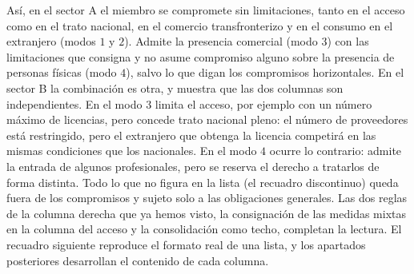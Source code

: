 \documentclass[10pt,a4paper]{article}
\begin{document}
Así, en el sector A el miembro se compromete sin limitaciones, tanto en el acceso como en el trato nacional, en el comercio transfronterizo y en el consumo en el extranjero (modos $1$ y $2$). Admite la presencia comercial (modo $3$) con las limitaciones que consigna y no asume compromiso alguno sobre la presencia de personas físicas (modo $4$), salvo lo que digan los compromisos horizontales. En el sector B la combinación es otra, y muestra que las dos columnas son independientes. En el modo $3$ limita el acceso, por ejemplo con un número máximo de licencias, pero concede trato nacional pleno: el número de proveedores está restringido, pero el extranjero que obtenga la licencia competirá en las mismas condiciones que los nacionales. En el modo $4$ ocurre lo contrario: admite la entrada de algunos profesionales, pero se reserva el derecho a tratarlos de forma distinta. Todo lo que no figura en la lista (el recuadro discontinuo) queda fuera de los compromisos y sujeto solo a las obligaciones generales. Las dos reglas de la columna derecha que ya hemos visto, la consignación de las medidas mixtas en la columna del acceso y la consolidación como techo, completan la lectura. El recuadro siguiente reproduce el formato real de una lista, y los apartados posteriores desarrollan el contenido de cada columna.
\end{document}
